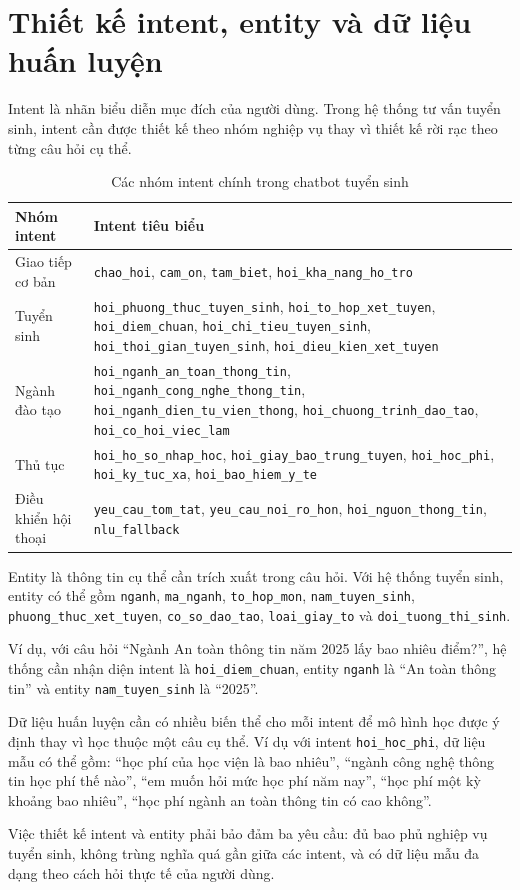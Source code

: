 \section{Thiết kế intent, entity và dữ liệu huấn luyện}

Intent là nhãn biểu diễn mục đích của người dùng. Trong hệ thống tư vấn tuyển sinh, intent cần được thiết kế theo nhóm nghiệp vụ thay vì thiết kế rời rạc theo từng câu hỏi cụ thể.

\begin{table}[H]
\centering
\begin{tabular}{|p{4cm}|p{8.5cm}|}
\hline
\textbf{Nhóm intent} & \textbf{Intent tiêu biểu} \\
\hline
Giao tiếp cơ bản & \texttt{chao\_hoi}, \texttt{cam\_on}, \texttt{tam\_biet}, \texttt{hoi\_kha\_nang\_ho\_tro} \\
\hline
Tuyển sinh & \texttt{hoi\_phuong\_thuc\_tuyen\_sinh}, \texttt{hoi\_to\_hop\_xet\_tuyen}, \texttt{hoi\_diem\_chuan}, \texttt{hoi\_chi\_tieu\_tuyen\_sinh}, \texttt{hoi\_thoi\_gian\_tuyen\_sinh}, \texttt{hoi\_dieu\_kien\_xet\_tuyen} \\
\hline
Ngành đào tạo & \texttt{hoi\_nganh\_an\_toan\_thong\_tin}, \texttt{hoi\_nganh\_cong\_nghe\_thong\_tin}, \texttt{hoi\_nganh\_dien\_tu\_vien\_thong}, \texttt{hoi\_chuong\_trinh\_dao\_tao}, \texttt{hoi\_co\_hoi\_viec\_lam} \\
\hline
Thủ tục & \texttt{hoi\_ho\_so\_nhap\_hoc}, \texttt{hoi\_giay\_bao\_trung\_tuyen}, \texttt{hoi\_hoc\_phi}, \texttt{hoi\_ky\_tuc\_xa}, \texttt{hoi\_bao\_hiem\_y\_te} \\
\hline
Điều khiển hội thoại & \texttt{yeu\_cau\_tom\_tat}, \texttt{yeu\_cau\_noi\_ro\_hon}, \texttt{hoi\_nguon\_thong\_tin}, \texttt{nlu\_fallback} \\
\hline
\end{tabular}
\caption{Các nhóm intent chính trong chatbot tuyển sinh}
\label{tab:rasa-intent-groups}
\end{table}

Entity là thông tin cụ thể cần trích xuất trong câu hỏi. Với hệ thống tuyển sinh, entity có thể gồm \texttt{nganh}, \texttt{ma\_nganh}, \texttt{to\_hop\_mon}, \texttt{nam\_tuyen\_sinh}, \texttt{phuong\_thuc\_xet\_tuyen}, \texttt{co\_so\_dao\_tao}, \texttt{loai\_giay\_to} và \texttt{doi\_tuong\_thi\_sinh}.

Ví dụ, với câu hỏi ``Ngành An toàn thông tin năm 2025 lấy bao nhiêu điểm?'', hệ thống cần nhận diện intent là \texttt{hoi\_diem\_chuan}, entity \texttt{nganh} là ``An toàn thông tin'' và entity \texttt{nam\_tuyen\_sinh} là ``2025''.

Dữ liệu huấn luyện cần có nhiều biến thể cho mỗi intent để mô hình học được ý định thay vì học thuộc một câu cụ thể. Ví dụ với intent \texttt{hoi\_hoc\_phi}, dữ liệu mẫu có thể gồm: ``học phí của học viện là bao nhiêu'', ``ngành công nghệ thông tin học phí thế nào'', ``em muốn hỏi mức học phí năm nay'', ``học phí một kỳ khoảng bao nhiêu'', ``học phí ngành an toàn thông tin có cao không''.

Việc thiết kế intent và entity phải bảo đảm ba yêu cầu: đủ bao phủ nghiệp vụ tuyển sinh, không trùng nghĩa quá gần giữa các intent, và có dữ liệu mẫu đa dạng theo cách hỏi thực tế của người dùng.


